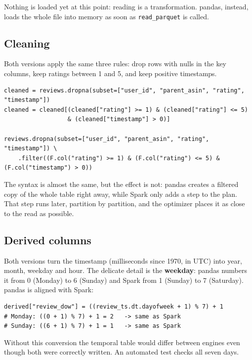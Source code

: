 \documentclass[11pt,a4paper]{article}
\begin{document}
Nothing is loaded yet at this point: reading is a transformation. pandas, instead, loads the
whole file into memory as soon as \texttt{read\_parquet} is called.

\subsection{Cleaning}

Both versions apply the same three rules: drop rows with nulls in the key columns, keep
ratings between 1 and 5, and keep positive timestamps.

\begin{lstlisting}[caption={Cleaning in pandas (top) and Spark (bottom).}]
cleaned = reviews.dropna(subset=["user_id", "parent_asin", "rating", "timestamp"])
cleaned = cleaned[(cleaned["rating"] >= 1) & (cleaned["rating"] <= 5)
                  & (cleaned["timestamp"] > 0)]

reviews.dropna(subset=["user_id", "parent_asin", "rating", "timestamp"]) \
    .filter((F.col("rating") >= 1) & (F.col("rating") <= 5) & (F.col("timestamp") > 0))
\end{lstlisting}

The syntax is almost the same, but the effect is not: pandas creates a filtered copy of the
whole table right away, while Spark only adds a step to the plan. That step runs later,
partition by partition, and the optimizer places it as close to the read as possible.

\subsection{Derived columns}

Both versions turn the timestamp (milliseconds since 1970, in UTC) into year, month, weekday
and hour. The delicate detail is the \textbf{weekday}: pandas numbers it from 0 (Monday) to
6 (Sunday) and Spark from 1 (Sunday) to 7 (Saturday). pandas is aligned with Spark:

\begin{lstlisting}[caption={Converting the pandas weekday to Spark's numbering.}]
derived["review_dow"] = ((review_ts.dt.dayofweek + 1) % 7) + 1
# Monday: ((0 + 1) % 7) + 1 = 2   -> same as Spark
# Sunday: ((6 + 1) % 7) + 1 = 1   -> same as Spark
\end{lstlisting}

Without this conversion the temporal table would differ between engines even though both
were correctly written. An automated test checks all seven days.
\end{document}
